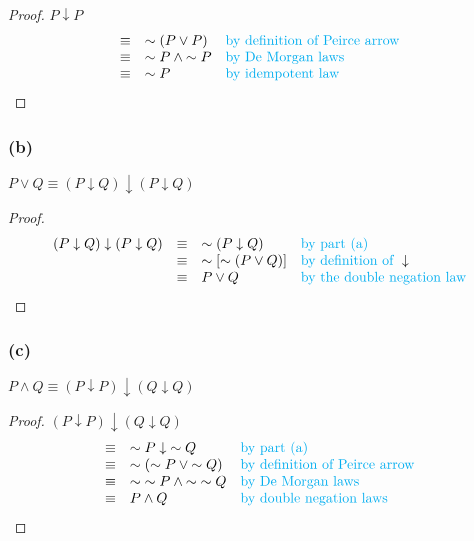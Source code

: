 \documentclass[14pt]{extarticle}
\newcommand{\da}{\downarrow}
\begin{document}
\begin{proof}
    $P \da P$
    $$
        \begin{array}{cll}
            \equiv & {\sim(P \vee P)}         & \text{\color{cyan}by definition of Peirce arrow} \\
            \equiv & {\sim P} \wedge {\sim P} & \text{\color{cyan}by De Morgan laws}             \\
            \equiv & {\sim P}                 & \text{\color{cyan}by idempotent law}             \\\end{array}
    $$
\end{proof}

\subsubsection{(b)}
$P \vee Q \equiv (P \da Q) \da (P \da Q)$

\begin{proof}
    $$
        \begin{array}{rcll}
            (P \da Q) \da (P \da Q) & \equiv & {\sim (P \da Q)}          & \text{\color{cyan}by part (a)}                \\
                                    & \equiv & {\sim[{\sim (P \vee Q)}]} & \text{\color{cyan}by definition of } \da      \\
                                    & \equiv & P \vee Q                  & \text{\color{cyan}by the double negation law} \\
        \end{array}
    $$
\end{proof}

\subsubsection{(c)}
$P \wedge Q \equiv (P \da P) \da (Q \da Q)$

\begin{proof}
    $(P \da P) \da (Q \da Q)$
    $$
        \begin{array}{cll}
            \equiv & {\sim P} \da {\sim Q}                  & \text{\color{cyan}by part (a)}                   \\
            \equiv & {\sim ({\sim P} \vee {\sim Q})}        & \text{\color{cyan}by definition of Peirce arrow} \\
            \equiv & {\sim {\sim P}} \wedge {\sim {\sim Q}} & \text{\color{cyan}by De Morgan laws}             \\
            \equiv & P \wedge Q                             & \text{\color{cyan}by double negation laws}       \\
        \end{array}
    $$
\end{proof}
\end{document}
